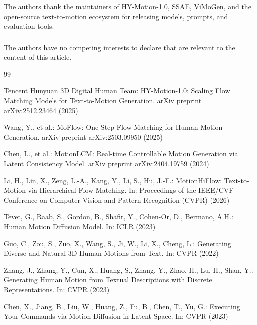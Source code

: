 \documentclass[runningheads]{llncs}
\begin{document}
\begin{credits}
\subsubsection{\ackname} The authors thank the maintainers of HY-Motion-1.0,
SSAE, ViMoGen, and the open-source text-to-motion ecosystem for releasing
models, prompts, and evaluation tools.

\subsubsection{\discintname}
The authors have no competing interests to declare that are relevant to the
content of this article.
\end{credits}

\begin{thebibliography}{99}

Tencent Hunyuan 3D Digital Human Team: HY-Motion-1.0: Scaling Flow Matching
Models for Text-to-Motion Generation. arXiv preprint arXiv:2512.23464 (2025)

Wang, Y., et al.: MoFlow: One-Step Flow Matching for Human Motion Generation.
arXiv preprint arXiv:2503.09950 (2025)

Chen, L., et al.: MotionLCM: Real-time Controllable Motion Generation via
Latent Consistency Model. arXiv preprint arXiv:2404.19759 (2024)

Li, H., Lin, X., Zeng, L.-A., Kang, Y., Li, S., Hu, J.-F.:
MotionHiFlow: Text-to-Motion via Hierarchical Flow Matching. In:
Proceedings of the IEEE/CVF Conference on Computer Vision and Pattern
Recognition (CVPR) (2026)

Tevet, G., Raab, S., Gordon, B., Shafir, Y., Cohen-Or, D., Bermano, A.H.:
Human Motion Diffusion Model. In: ICLR (2023)

Guo, C., Zou, S., Zuo, X., Wang, S., Ji, W., Li, X., Cheng, L.:
Generating Diverse and Natural 3D Human Motions from Text. In: CVPR (2022)

Zhang, J., Zhang, Y., Cun, X., Huang, S., Zhang, Y., Zhao, H., Lu, H.,
Shan, Y.: Generating Human Motion from Textual Descriptions with Discrete
Representations. In: CVPR (2023)

Chen, X., Jiang, B., Liu, W., Huang, Z., Fu, B., Chen, T., Yu, G.:
Executing Your Commands via Motion Diffusion in Latent Space. In: CVPR (2023)


\end{thebibliography}
\end{document}
